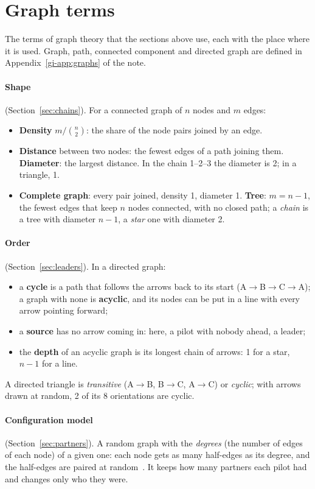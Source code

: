 \section{Graph terms}\label{app:graphs}

The terms of graph theory that the sections above use, each with the place where it is used. Graph,
path, connected component and directed graph are defined in Appendix~\ref{gi-app:graphs} of the note.

\paragraph{Shape} (Section~\ref{sec:chains}). For a connected graph of $n$ nodes and $m$ edges:
\begin{itemize}
  \item \textbf{Density} $m/\binom{n}{2}$: the share of the node pairs joined by an edge.
  \item \textbf{Distance} between two nodes: the fewest edges of a path joining them.
        \textbf{Diameter}: the largest distance. In the chain 1--2--3 the diameter is 2; in a
        triangle, 1.
  \item \textbf{Complete graph}: every pair joined, density 1, diameter 1. \textbf{Tree}: $m=n-1$,
        the fewest edges that keep $n$ nodes connected, with no closed path; a \emph{chain} is a tree
        with diameter $n-1$, a \emph{star} one with diameter 2.
\end{itemize}

\paragraph{Order} (Section~\ref{sec:leaders}). In a directed graph:
\begin{itemize}
  \item a \textbf{cycle} is a path that follows the arrows back to its start (A$\to$B$\to$C$\to$A);
        a graph with none is \textbf{acyclic}, and its nodes can be put in a line with every arrow
        pointing forward;
  \item a \textbf{source} has no arrow coming in: here, a pilot with nobody ahead, a leader;
  \item the \textbf{depth} of an acyclic graph is its longest chain of arrows: 1 for a star, $n-1$
        for a line.
\end{itemize}
A directed triangle is \emph{transitive} (A$\to$B, B$\to$C, A$\to$C) or \emph{cyclic}; with arrows
drawn at random, 2 of its 8 orientations are cyclic.

\paragraph{Configuration model} (Section~\ref{sec:partners}). A random graph with the
\emph{degrees} (the number of edges of each node) of a given one: each node gets as many half-edges
as its degree, and the half-edges are paired at random~\cite{newman2010}. It keeps how many
partners each pilot had and changes only who they were.
